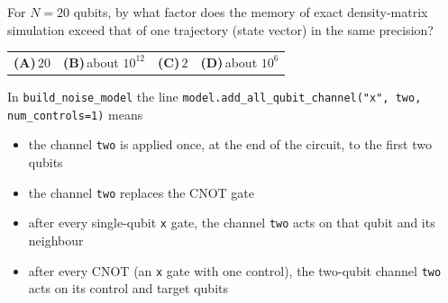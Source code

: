 \documentclass[11pt,a4paper]{article}
\newcommand{\optlabel}[1]{\textbf{(#1)}}
\newenvironment{qitem}[1]{\begin{list}{}{\setlength{\leftmargin}{3.3em}\setlength{\labelwidth}{3.1em}%
  \setlength{\labelsep}{0.2em}\setlength{\topsep}{3pt}\setlength{\parsep}{3pt}}\item[\textbf{Q.#1}\hfill]}{\end{list}}
\newcommand{\qsep}{\par\vspace{2pt}{\color{black!15}\hrule}\vspace{4pt}}
\begin{document}
\begin{qitem}{53}
For $N = 20$ qubits, by what factor does the memory of exact density-matrix simulation exceed that of one trajectory (state vector) in the same precision?
\par\smallskip\noindent\begin{tabularx}{\linewidth}{@{}*{4}{L}@{}}
\optlabel{A}\,$20$ & \optlabel{B}\,about $10^{12}$ & \optlabel{C}\,$2$ & \optlabel{D}\,about $10^6$
\end{tabularx}
\end{qitem}
\qsep

\begin{qitem}{54}
In \texttt{build\_noise\_model} the line \texttt{model.add\_all\_qubit\_channel("x", two, num\_controls=1)} means
\begin{itemize}[leftmargin=2.6em, labelsep=0.4em, itemsep=2pt, topsep=3pt]
\item[\optlabel{A}] the channel \texttt{two} is applied once, at the end of the circuit, to the first two qubits
\item[\optlabel{B}] the channel \texttt{two} replaces the CNOT gate
\item[\optlabel{C}] after every single-qubit \texttt{x} gate, the channel \texttt{two} acts on that qubit and its neighbour
\item[\optlabel{D}] after every CNOT (an \texttt{x} gate with one control), the two-qubit channel \texttt{two} acts on its control and target qubits
\end{itemize}
\end{qitem}
\qsep
\end{document}
